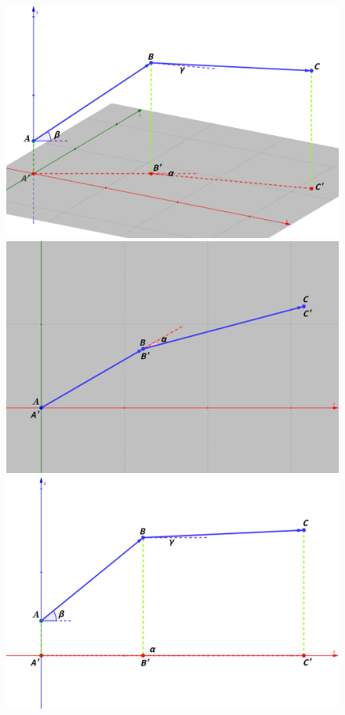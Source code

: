 \documentclass[utf8]{ctexart} %
\begin{document}
	 \begin{figure}[ht]
	 	\centering
	 	\label{explain}
	 	\begin{minipage}[b]{0.33\textwidth} %
	 		\centering
	 		\includegraphics[width=\textwidth]{figures/explain_angle_main.png}
	 	\end{minipage}\hfill
	 	\begin{minipage}[b]{0.33\textwidth} %
	 		\centering
	 		\includegraphics[width=\textwidth]{figures/explain_angle_top.png}
	 	\end{minipage}
 	\begin{minipage}[b]{0.33\textwidth} %
 		\centering
 		\includegraphics[width=\textwidth]{figures/explain_angle_front.png}

\end{minipage}
\end{figure}
\end{document}

